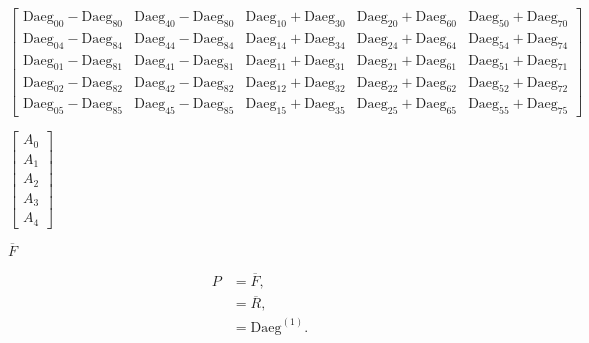 \documentclass[a4paper,11pt,twoside,openright]{book}
\def\lthtmlcheckvsize{\ifdim\ht\sizebox<\vsize 
  \ifdim\wd\sizebox<\hsize\expandafter\hfill\fi \expandafter\vfill
  \else\expandafter\vss\fi}%
\begin{document}
{\newpage\clearpage
{}%
$\displaystyle \begin{bmatrix}
\textrm{Daeg}_{00} - \textrm{Daeg}_{80}  &  \textrm{Daeg}_{40} - \textrm{Daeg}_{80} &  \textrm{Daeg}_{10} + \textrm{Daeg}_{30} &  \textrm{Daeg}_{20} + \textrm{Daeg}_{60} &  \textrm{Daeg}_{50} + \textrm{Daeg}_{70} \\
\textrm{Daeg}_{04} - \textrm{Daeg}_{84}  &  \textrm{Daeg}_{44} - \textrm{Daeg}_{84} &  \textrm{Daeg}_{14} + \textrm{Daeg}_{34} &  \textrm{Daeg}_{24} + \textrm{Daeg}_{64} &  \textrm{Daeg}_{54} + \textrm{Daeg}_{74} \\
\textrm{Daeg}_{01} - \textrm{Daeg}_{81}  &  \textrm{Daeg}_{41} - \textrm{Daeg}_{81} &  \textrm{Daeg}_{11} + \textrm{Daeg}_{31} &  \textrm{Daeg}_{21} + \textrm{Daeg}_{61} &  \textrm{Daeg}_{51} + \textrm{Daeg}_{71} \\
\textrm{Daeg}_{02} - \textrm{Daeg}_{82}  &  \textrm{Daeg}_{42} - \textrm{Daeg}_{82} &  \textrm{Daeg}_{12} + \textrm{Daeg}_{32} &  \textrm{Daeg}_{22} + \textrm{Daeg}_{62} &  \textrm{Daeg}_{52} + \textrm{Daeg}_{72} \\
\textrm{Daeg}_{05} - \textrm{Daeg}_{85}  &  \textrm{Daeg}_{45} - \textrm{Daeg}_{85} &  \textrm{Daeg}_{15} + \textrm{Daeg}_{35} &  \textrm{Daeg}_{25} + \textrm{Daeg}_{65} &  \textrm{Daeg}_{55} + \textrm{Daeg}_{75}
\end{bmatrix}$%
\lthtmlindisplaymathZ
\lthtmlcheckvsize\clearpage}

{\newpage\clearpage
{}%
$\displaystyle \begin{bmatrix}
A_0 \\
A_1 \\
A_2 \\
A_3 \\
A_4
\end{bmatrix}$%
\lthtmlindisplaymathZ
\lthtmlcheckvsize\clearpage}

{\newpage\clearpage
{}%
$ \overline{{F}}$%
\lthtmlindisplaymathZ
\lthtmlcheckvsize\clearpage}

{\newpage\clearpage
\setcounter{equation}{50}
%
\begin{subequations}\begin{align}
P &= \overline{F} , \\
&= \overline{R} , \\
&= \textrm{Daeg}^{(1)}.
\end{align}\end{subequations}%
\lthtmldisplayZ
\lthtmlcheckvsize\clearpage}
\end{document}

